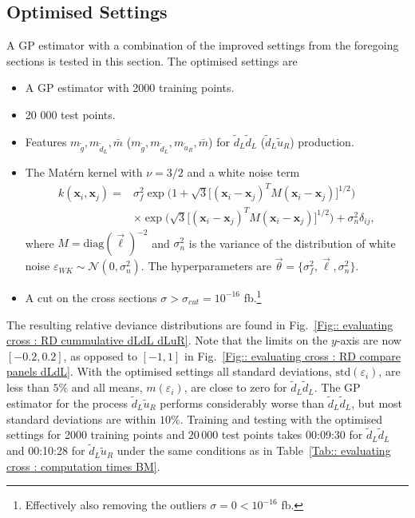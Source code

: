 \documentclass[twoside,english]{uiofysmaster}
\begin{document}
{{%

\subsection{Optimised Settings}\label{Sec:: evaluating cross : Optimal Settings}

A GP estimator with a combination of the improved settings from the foregoing sections is tested in this section. The optimised settings are 
\begin{itemize}
\item A GP estimator with 2000 training points.
\item 20 000 test points.
\item Features $m_{\widetilde{g}}, m_{\widetilde{d}_L}, \bar{m}$ ($m_{\widetilde{g}}, m_{\widetilde{d}_L}, m_{\widetilde{u}_R}, \bar{m}$) for $\widetilde{d}_L \widetilde{d}_L$ ($\widetilde{d}_L \widetilde{u}_R$) production.
\item The Mat\'{e}rn kernel with $\nu=3/2$ and a white noise term
\begin{align}
k (\textbf{x}_i, \textbf{x}_j) =& \sigma_f^2 \exp \Big( 1 + \sqrt{3} \big[ (\textbf{x}_i - \textbf{x}_j)^T M (\textbf{x}_i - \textbf{x}_j) \big]^{1/2} \Big)\\ & \times  \exp \Big( \sqrt{3} \big[ (\textbf{x}_i - \textbf{x}_j)^T M (\textbf{x}_i - \textbf{x}_j) \big]^{1/2} \Big) + \sigma_n^2 \delta_{ij},
\end{align}
where $M = \text{diag}(\vec{\ell})^{-2}$ and $\sigma_n^2$ is the variance of the distribution of white noise $\varepsilon_{WK} \sim \mathcal{N}(0, \sigma_n^2)$. The hyperparameters are $\vec{\theta} = \{ \sigma_f^2, \vec{\ell}, \sigma_n^2\}$.
\item A cut on the cross sections $\sigma > \sigma_{cut} = 10^{-16}$ fb.\footnote{Effectively also removing the outliers $\sigma = 0 < 10^{-16}$ fb.}
\end{itemize}
The resulting relative deviance distributions are found in Fig.~\ref{Fig:: evaluating cross : RD cummulative dLdL dLuR}. Note that the limits on the $y$-axis are now $[-0.2, 0.2]$, as opposed to $[-1, 1]$ in Fig.~\ref{Fig:: evaluating cross : RD compare panels dLdL}. With the optimised settings all standard deviations, $\mathrm{std}(\varepsilon_i)$, are less than $5\%$ and all means, $m(\varepsilon_i)$, are close to zero for $\widetilde{d}_L \widetilde{d}_L$. The GP estimator for the process $\widetilde{d}_L \widetilde{u}_R$ performs considerably worse than $\widetilde{d}_L \widetilde{d}_L$, but most standard deviations are within $10 \%$. Training and testing with the optimised settings for 2000 training points and $20\,000$ test points takes 00:09:30 for $\widetilde{d}_L \widetilde{d}_L$ and 00:10:28 for $\widetilde{d}_L \widetilde{u}_R$ under the same conditions as in Table~\ref{Tab:: evaluating cross : computation times BM}. 

}}
\end{document}
